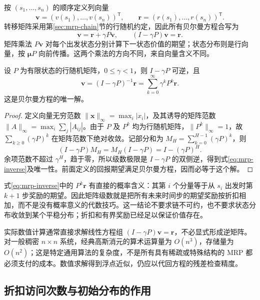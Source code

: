 \documentclass[UTF8,12pt,a4paper,fontset=fandol]{ctexart}
\begin{document}
按 $(s_1,\ldots,s_n)$ 的顺序定义列向量
\[
  \boldsymbol v=(v(s_1),\ldots,v(s_n))^{\mathsf T},\qquad
  \boldsymbol r=(r(s_1),\ldots,r(s_n))^{\mathsf T}.
\]
转移矩阵采用第\ref{sec:mrp-chain}节的行随机约定，因此所有贝尔曼方程合写为
\begin{equation}
  \boldsymbol v=\boldsymbol r+\gamma P\boldsymbol v,
  \qquad (I-\gamma P)\boldsymbol v=\boldsymbol r.
  \label{eq:mrp-linear-system}
\end{equation}
矩阵乘法 $P\boldsymbol v$ 对每个出发状态分别计算下一状态价值的期望；状态分布则是行向量，按 $\boldsymbol\mu P$ 向前传播。这两个乘法的方向不同，来自向量含义不同。

\begin{theorem}[折扣价值的唯一解]
\label{thm:mrp-inverse}
设 $P$ 为有限状态的行随机矩阵，$0\leq\gamma<1$，则 $I-\gamma P$ 可逆，且
\begin{equation}
  \boldsymbol v=(I-\gamma P)^{-1}\boldsymbol r
  =\sum_{k=0}^{\infty}\gamma^kP^k\boldsymbol r.
  \label{eq:mrp-inverse}
\end{equation}
这是贝尔曼方程的唯一解。
\end{theorem}

\begin{proof}
定义向量无穷范数 $\|\boldsymbol x\|_\infty=\max_i|x_i|$，及其诱导的矩阵范数 $\|A\|_\infty=\max_i\sum_j|A_{ij}|$。由于 $P$ 及 $P^k$ 均为行随机矩阵，$\|P^k\|_\infty=1$，故 $\sum_{k\geq0}(\gamma P)^k$ 在矩阵范数下绝对收敛。记部分和为 $M_H=\sum_{k=0}^{H-1}(\gamma P)^k$，则
\[
  (I-\gamma P)M_H=M_H(I-\gamma P)=I-(\gamma P)^H.
\]
余项范数不超过 $\gamma^H$，趋于零，所以级数极限是 $I-\gamma P$ 的双侧逆，得到式\eqref{eq:mrp-inverse}及唯一性。前面定义的回报期望满足贝尔曼方程，因而必等于这个解。
\end{proof}

式\eqref{eq:mrp-inverse}中的 $P^k\boldsymbol r$ 有直接的概率含义：其第 $i$ 个分量等于从 $s_i$ 出发时第 $k+1$ 步奖励的期望。因此矩阵级数就是把所有未来时间步的期望奖励按折扣相加，而不是没有概率意义的代数技巧。这一结论不要求链不可约，也不要求状态分布收敛到某个平稳分布；折扣和有界奖励已经足以保证价值存在。

实际数值计算通常直接求解线性方程组 $(I-\gamma P)\boldsymbol v=\boldsymbol r$，不必显式形成逆矩阵。对一般稠密 $n\times n$ 系统，经典高斯消元的算术运算量为 $O(n^3)$，存储量为 $O(n^2)$；这是特定通用算法的复杂度，不是所有具有稀疏或特殊结构的 MRP 都必须支付的成本。数值求解得到浮点近似，仍应以代回方程的残差检查精度。

\subsection{折扣访问次数与初始分布的作用}
\end{document}
